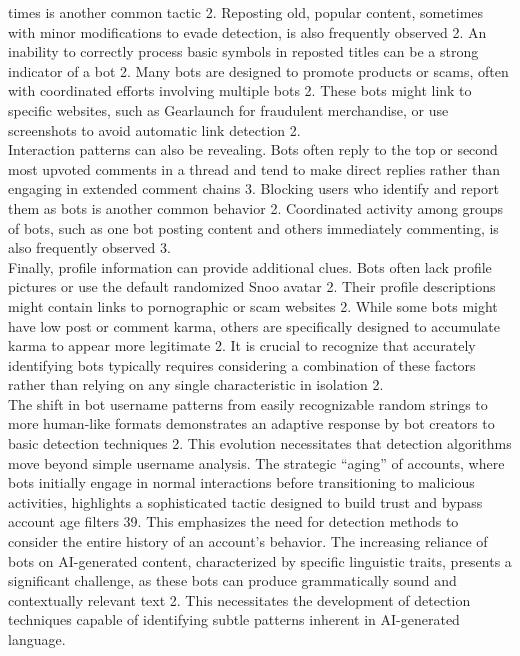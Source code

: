 \documentclass[
  12pt,
  letterpaper,
  DIV=11,
  numbers=noendperiod]{scrartcl}
\begin{document}
times is another common tactic 2. Reposting old, popular content,
sometimes with minor modifications to evade detection, is also
frequently observed 2. An inability to correctly process basic symbols
in reposted titles can be a strong indicator of a bot 2. Many bots are
designed to promote products or scams, often with coordinated efforts
involving multiple bots 2. These bots might link to specific websites,
such as Gearlaunch for fraudulent merchandise, or use screenshots to
avoid automatic link detection 2.\\
Interaction patterns can also be revealing. Bots often reply to the top
or second most upvoted comments in a thread and tend to make direct
replies rather than engaging in extended comment chains 3. Blocking
users who identify and report them as bots is another common behavior 2.
Coordinated activity among groups of bots, such as one bot posting
content and others immediately commenting, is also frequently observed
3.\\
Finally, profile information can provide additional clues. Bots often
lack profile pictures or use the default randomized Snoo avatar 2. Their
profile descriptions might contain links to pornographic or scam
websites 2. While some bots might have low post or comment karma, others
are specifically designed to accumulate karma to appear more legitimate
2. It is crucial to recognize that accurately identifying bots typically
requires considering a combination of these factors rather than relying
on any single characteristic in isolation 2.\\
The shift in bot username patterns from easily recognizable random
strings to more human-like formats demonstrates an adaptive response by
bot creators to basic detection techniques 2. This evolution
necessitates that detection algorithms move beyond simple username
analysis. The strategic ``aging'' of accounts, where bots initially
engage in normal interactions before transitioning to malicious
activities, highlights a sophisticated tactic designed to build trust
and bypass account age filters 39. This emphasizes the need for
detection methods to consider the entire history of an account's
behavior. The increasing reliance of bots on AI-generated content,
characterized by specific linguistic traits, presents a significant
challenge, as these bots can produce grammatically sound and
contextually relevant text 2. This necessitates the development of
detection techniques capable of identifying subtle patterns inherent in
AI-generated language.
\end{document}
